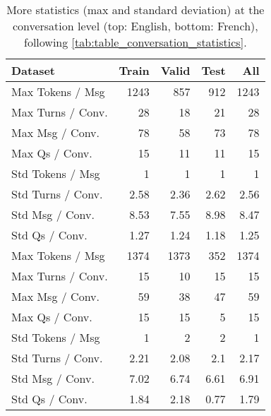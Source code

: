 \documentclass[11pt]{article}
\begin{document}
\begin{table}[h]
    \small
    \centering
\begin{tabular}{lrrrr}
\toprule
          Dataset &  Train &  Valid &  Test &   All \\
\midrule
 Max Tokens / Msg &   1243 &    857 &   912 &  1243 \\
Max Turns / Conv. &     28 &     18 &    21 &    28 \\
  Max Msg / Conv. &     78 &     58 &    73 &    78 \\
   Max Qs / Conv. &     15 &     11 &    11 &    15 \\
 Std Tokens / Msg &      1 &      1 &     1 &     1 \\
Std Turns / Conv. &   2.58 &   2.36 &  2.62 &  2.56 \\
  Std Msg / Conv. &   8.53 &   7.55 &  8.98 &  8.47 \\
   Std Qs / Conv. &   1.27 &   1.24 &  1.18 &  1.25 \\
   \midrule
 Max Tokens / Msg &   1374 &   1373 &   352 &  1374 \\
Max Turns / Conv. &     15 &     10 &    15 &    15 \\
  Max Msg / Conv. &     59 &     38 &    47 &    59 \\
   Max Qs / Conv. &     15 &     15 &     5 &    15 \\
 Std Tokens / Msg &      1 &      2 &     2 &     1 \\
Std Turns / Conv. &   2.21 &   2.08 &   2.1 &  2.17 \\
  Std Msg / Conv. &   7.02 &   6.74 &  6.61 &  6.91 \\
   Std Qs / Conv. &   1.84 &   2.18 &  0.77 &  1.79 \\
\bottomrule
\end{tabular}
    \caption{More statistics (max and standard deviation) at the conversation level (top: English, bottom: French), following \autoref{tab:table_conversation_statistics}.}
    \label{tab:more_stats_conversation}
\end{table}
\end{document}
